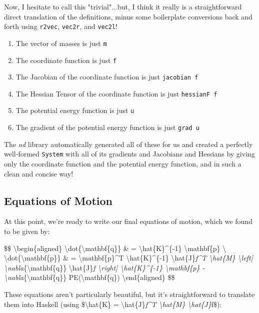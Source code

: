 \documentclass[]{article}
\begin{document}
Now, I hesitate to call this "trivial"...but, I think it really is a
straightforward direct translation of the definitions, minus some boilerplate
conversions back and forth using \texttt{r2vec}, \texttt{vec2r}, and
\texttt{vec2l}!

\begin{enumerate}
\tightlist
\item
  The vector of masses is just \texttt{m}
\item
  The coordinate function is just \texttt{f}
\item
  The Jacobian of the coordinate function is just \texttt{jacobian\ f}
\item
  The Hessian Tensor of the coordinate function is just \texttt{hessianF\ f}
\item
  The potential energy function is just \texttt{u}
\item
  The gradient of the potential energy function is just \texttt{grad\ u}
\end{enumerate}

The \emph{ad} library automatically generated all of these for us and created a
perfectly well-formed \texttt{System} with all of its gradients and Jacobians
and Hessians by giving only the coordinate function and the potential energy
function, and in such a clean and concise way!

\subsection{Equations of Motion}

At this point, we're ready to write our final equations of motion, which we
found to be given by:

\$\$ \textbackslash{}begin\{aligned\}
\textbackslash{}dot\{\textbackslash{}mathbf\{q\}\} \& =
\textbackslash{}hat\{K\}\^{}\{-1\} \textbackslash{}mathbf\{p\} \textbackslash{}
\textbackslash{}dot\{\textbackslash{}mathbf\{p\}\} \& =
\textbackslash{}mathbf\{p\}\^{}T \textbackslash{}hat\{K\}\^{}\{-1\}
\textbackslash{}hat\{J\}\emph{f\^{}T \textbackslash{}hat\{M\}
\textbackslash{}left{[} \textbackslash{}nabla}\{\textbackslash{}mathbf\{q\}\}
\textbackslash{}hat\{J\}\emph{f \textbackslash{}right{]}
\textbackslash{}hat\{K\}\^{}\{-1\} \textbackslash{}mathbf\{p\} -
\textbackslash{}nabla}\{\textbackslash{}mathbf\{q\}\}
PE(\textbackslash{}mathbf\{q\}) \textbackslash{}end\{aligned\} \$\$

These equations aren't particularly beautiful, but it's straightforward to
translate them into Haskell (using \$\textbackslash{}hat\{K\} =
\textbackslash{}hat\{J\}\emph{f\^{}T \textbackslash{}hat\{M\}
\textbackslash{}hat\{J\}}f\$):
\end{document}
